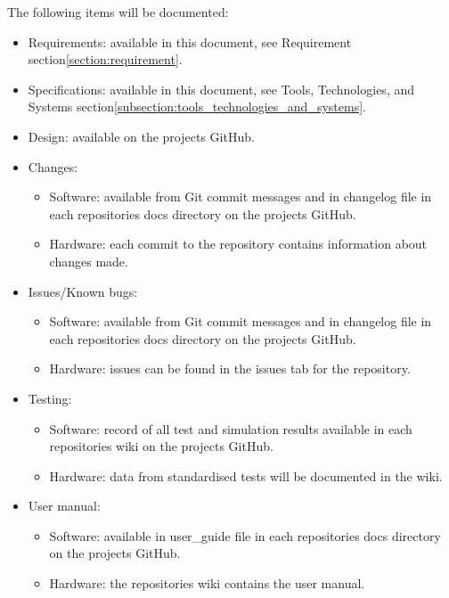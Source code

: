 The following items will be documented:
\begin{itemize}
    \item Requirements: available in this document, see Requirement section\:\ref{section:requirement}.
    \item Specifications: available in this document, see Tools, Technologies, and Systems section\:\ref{subsection:tools_technologies_and_systems}.
    \item Design: available on the projects GitHub.
    \item Changes:
    \begin{itemize}
        \item Software: available from Git commit messages and in changelog file in each repositories docs directory on the projects GitHub.
        \item Hardware: each commit to the repository contains information about changes made.
    \end{itemize}
    \item Issues/Known bugs:
    \begin{itemize}
        \item Software: available from Git commit messages and in changelog file in each repositories docs directory on the projects GitHub.
        \item Hardware: issues can be found in the issues tab for the repository.
    \end{itemize}
    \item Testing: 
    \begin{itemize}
        \item Software: record of all test and simulation results available in each repositories wiki on the projects GitHub.
        \item Hardware: data from standardised tests will be documented in the wiki.
    \end{itemize}
    \item User manual:
    \begin{itemize}
        \item Software: available in user\_guide file in each repositories docs directory on the projects GitHub.
        \item Hardware: the repositories wiki contains the user manual.
    \end{itemize}
\end{itemize}

